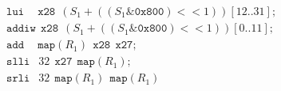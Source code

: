 \begin{align*}
  &\texttt{lui  }\ \ \ \ 
    \texttt{x28}\ \ 
    (S_1 + ((S_1 \& \texttt{0x800}) << 1))[12..31];\\
  &\texttt{addiw}\ \ 
    \texttt{x28}\ \ 
    (S_1 + ((S_1 \& \texttt{0x800}) << 1))[0..11];\\
  &\texttt{add  }\ \ \ \ 
    \texttt{map}(R_1)\ \ 
    \texttt{x28}\ \ 
    \texttt{x27};\\
  &\texttt{slli }\ \ 
    32\ \ 
    \texttt{x27}\ \ 
    \texttt{map}(R_1);\\
  &\texttt{srli }\ \ 
    32\ \ 
    \texttt{map}(R_1)\ \ 
    \texttt{map}(R_1)\\
\end{align*}

